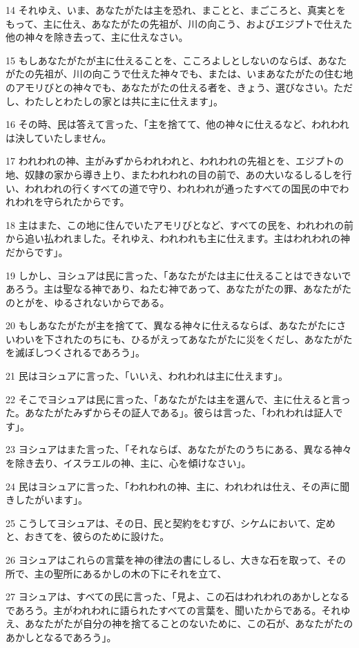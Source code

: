 \par 14 それゆえ、いま、あなたがたは主を恐れ、まことと、まごころと、真実とをもって、主に仕え、あなたがたの先祖が、川の向こう、およびエジプトで仕えた他の神々を除き去って、主に仕えなさい。
\par 15 もしあなたがたが主に仕えることを、こころよしとしないのならば、あなたがたの先祖が、川の向こうで仕えた神々でも、または、いまあなたがたの住む地のアモリびとの神々でも、あなたがたの仕える者を、きょう、選びなさい。ただし、わたしとわたしの家とは共に主に仕えます」。
\par 16 その時、民は答えて言った、「主を捨てて、他の神々に仕えるなど、われわれは決していたしません。
\par 17 われわれの神、主がみずからわれわれと、われわれの先祖とを、エジプトの地、奴隷の家から導き上り、またわれわれの目の前で、あの大いなるしるしを行い、われわれの行くすべての道で守り、われわれが通ったすべての国民の中でわれわれを守られたからです。
\par 18 主はまた、この地に住んでいたアモリびとなど、すべての民を、われわれの前から追い払われました。それゆえ、われわれも主に仕えます。主はわれわれの神だからです」。
\par 19 しかし、ヨシュアは民に言った、「あなたがたは主に仕えることはできないであろう。主は聖なる神であり、ねたむ神であって、あなたがたの罪、あなたがたのとがを、ゆるされないからである。
\par 20 もしあなたがたが主を捨てて、異なる神々に仕えるならば、あなたがたにさいわいを下されたのちにも、ひるがえってあなたがたに災をくだし、あなたがたを滅ぼしつくされるであろう」。
\par 21 民はヨシュアに言った、「いいえ、われわれは主に仕えます」。
\par 22 そこでヨシュアは民に言った、「あなたがたは主を選んで、主に仕えると言った。あなたがたみずからその証人である」。彼らは言った、「われわれは証人です」。
\par 23 ヨシュアはまた言った、「それならば、あなたがたのうちにある、異なる神々を除き去り、イスラエルの神、主に、心を傾けなさい」。
\par 24 民はヨシュアに言った、「われわれの神、主に、われわれは仕え、その声に聞きしたがいます」。
\par 25 こうしてヨシュアは、その日、民と契約をむすび、シケムにおいて、定めと、おきてを、彼らのために設けた。
\par 26 ヨシュアはこれらの言葉を神の律法の書にしるし、大きな石を取って、その所で、主の聖所にあるかしの木の下にそれを立て、
\par 27 ヨシュアは、すべての民に言った、「見よ、この石はわれわれのあかしとなるであろう。主がわれわれに語られたすべての言葉を、聞いたからである。それゆえ、あなたがたが自分の神を捨てることのないために、この石が、あなたがたのあかしとなるであろう」。
